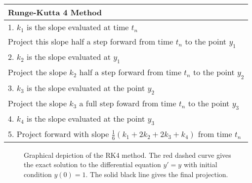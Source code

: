 \begin{center}
    \begin{tabular}{|l|}
        \hline
        Runge-Kutta 4 Method \\ \hline \hline
        1. $k_1$ is the slope evaluated at time $t_n$ \\ 
        Project this slope half a step forward from time $t_n$ to the point $y_1$ \\ \hline
        2. $k_2$ is the slope evaluated at $y_1$ \\ 
        Project the slope $k_2$ half a step forward from time $t_n$ to the point $y_2$
        \\ \hline
        3. $k_3$ is the slope evaluated at the point $y_2$ \\
        Project the slope $k_3$ a full step foward from time $t_n$ to the point $y_3$ \\
        \hline
        4. $k_4$ is the slope evaluated at the point $y_3$ \\ \hline
        5. Project forward with slope $\frac{1}{6}(k_1 + 2k_2 + 2k_3 + k_4)$ from time
        $t_n$ \\ \hline
    \end{tabular}
\end{center}

\begin{figure}[ht!]
    \begin{center}
    \end{center}
    \caption{Graphical depiction of the RK4 method.  The red dashed curve gives the exact
    solution to the differential equation $y' = y$ with initial condition $y(0) = 1$. The
solid black line gives the final projection.}
    \label{fig:RK4_graphical}
\end{figure}


